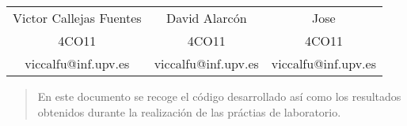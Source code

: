 \vfill
{
    \maketitle
    \vspace{1cm}
    \begin{center}
    \begin{tabular}{c c c}
        Victor Callejas Fuentes &  David Alarcón & Jose \\
        \small 4CO11 & 4CO11 & 4CO11 \\
        \small viccalfu@inf.upv.es & viccalfu@inf.upv.es & viccalfu@inf.upv.es \\
    \end{tabular}
    \end{center}
    \vspace{1cm}
    \begin{abstract}
        \center En este documento se recoge el código desarrollado así como los resultados obtenidos durante la realización de las práctias de laboratorio.
    \end{abstract}

    \newpage
}